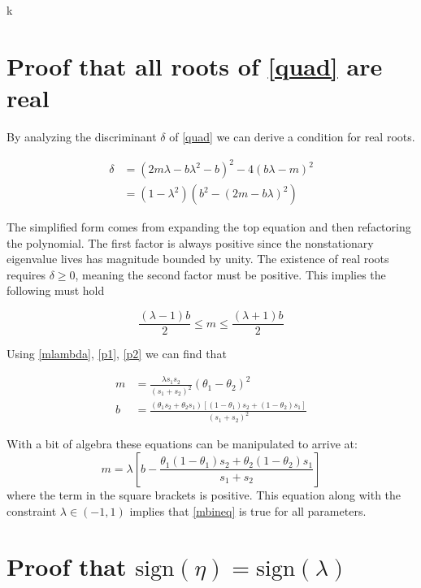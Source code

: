 k\documentclass{article}
\begin{document}
\appendix 

\section{Proof that all roots of \eqref{quad} are real}\label{sec:real}

By analyzing the discriminant $\delta$ of \eqref{quad} we can derive a condition for real roots. 

\begin{align}
    \delta &= (2m\lambda - b\lambda^2 -b)^2 - 4(b\lambda-m)^2\\
    &= (1-\lambda^2)(b^2 - (2m-b\lambda)^2)
\end{align}

The simplified form comes from expanding the top equation and then refactoring the polynomial. The first factor is always positive since the nonstationary eigenvalue lives has magnitude bounded by unity. The existence of real roots requires $\delta \ge 0$, meaning the second factor must be positive. This implies the following must hold

\begin{equation}\label{mbineq}
    \frac{(\lambda -1)b}{2} \le m \le \frac{(\lambda+1)b}{2}
\end{equation}

Using \eqref{mlambda}, \eqref{p1}, \eqref{p2} we can find that 

\begin{align}
    m &= \frac{\lambda s_1s_2}{(s_1+s_2)^2}(\theta_1 -\theta_2)^2 \\
    b &= \frac{(\theta_1s_2 + \theta_2s_1)[(1-\theta_1)s_2 + (1-\theta_2)s_1]}{(s_1 + s_2)^2}
\end{align}

With a bit of algebra these equations can be manipulated to arrive at:
\begin{equation}\label{mbid}
    m = \lambda\left[b - \frac{\theta_1(1-\theta_1)s_2 + \theta_2(1-\theta_2)s_1}{s_1+s_2}\right]
\end{equation}
where the term in the square brackets is positive. This equation along with the constraint $\lambda \in (-1,1)$ implies that \eqref{mbineq} is true for all parameters. 

\section{Proof that $\text{sign}(\eta) = \text{sign}(\lambda)$}\label{sec:signed}
\end{document}
